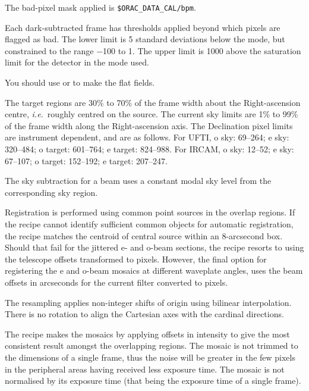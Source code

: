 \documentclass[twoside,11pt,nolof]{starlink}
\begin{document}
{{{         \sstitem
         The bad-pixel mask applied is {\tt\$ORAC\_DATA\_CAL/bpm}.

         \sstitem
         Each dark-subtracted frame has thresholds applied beyond which
         pixels are flagged as bad.  The lower limit is 5 standard
         deviations below the mode, but constrained to the range $-$100 to 1.
         The upper limit is 1000 above the saturation limit for the detector
         in the mode used.

         \sstitem
         You should use  or
          to make the
         flat fields.

         \sstitem
         The target regions are 30\% to 70\% of the frame width about
         the Right-ascension centre, \emph{{i.e.}}\ roughly centred on the source.
         The current sky limits are 1\% to 99\% of the frame width along the
         Right-ascension axis.  The Declination pixel limits are instrument
         dependent, and are as follows.  For UFTI, o sky: 69--264;
         e sky: 320--484; o target: 601--764; e target: 824--988.  For
         IRCAM, o sky: 12--52; e sky: 67--107; o target: 152--192;
         e target: 207--247.

         \sstitem
         The sky subtraction for a beam uses a constant modal sky level
         from the corresponding sky region.

         \sstitem
         Registration is performed using common point sources in the
         overlap regions.  If the recipe cannot identify sufficient common
         objects for automatic registration, the recipe matches the centroid
         of central source within an 8-arcsecond box.  Should that fail for
         the jittered e- and o-beam sections, the recipe resorts to using the
         telescope offsets transformed to pixels.  However, the final option
         for registering the e and o-beam mosaics at different waveplate
         angles, uses the beam offsets in arcseconds for the current filter
         converted to pixels.

         \sstitem
         The resampling applies non-integer shifts of origin using
         bilinear interpolation.  There is no rotation to align the
         Cartesian axes with the cardinal directions.

         \sstitem
         The recipe makes the mosaics by applying offsets in intensity
         to give the most consistent result amongst the overlapping regions.
         The mosaic is not trimmed to the dimensions of a single frame, thus
         the noise will be greater in the few pixels in the peripheral areas
         having received less exposure time.  The mosaic is not normalised by
         its exposure time (that being the exposure time of a single frame).

}}}
\end{document}
